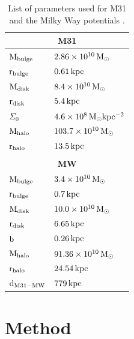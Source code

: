 \documentclass[useAMS,usenatbib]{mn2e}
\begin{document}
\begin{table}
\centering
\begin{tabular}{l l }
\multicolumn{2}{c}{\textbf{M31}}\\
\hline
\hline
$\rm{M}_{bulge}$   	& $2.86\times{10^{10}}\,\rm{M}_{\odot}$\\
$\rm{r}_{bulge}$	& $0.61\,\rm{kpc}$\\
$\rm{M}_{disk}$		&  $8.4\times{10^{10}}\,\rm{M}_{\odot}$\\
$\rm{r}_{disk}$		& $5.4\,\rm{kpc}$\\
$\Sigma_{0}$		& $4.6\times10^{8}\,\rm{M}_{\odot}\rm{kpc^{-2}}$\\
$\rm{M}_{halo}$		&  $103.7\times{10^{10}}\,\rm{M}_{\odot}$\\
$\rm{r}_{halo}$		& $13.5\,\rm{kpc}$\\
&\\
\multicolumn{2}{c}{\textbf{MW}}\\
\hline
\hline
$\rm{M}_{bulge}$       & $ 3.4\times{10^{10}}\,\rm{M}_{\odot}$   \\
$\rm{r}_{bulge}$       & $ 0.7\,\rm{kpc}$                        \\
$\rm{M}_{disk}$        & $ 10.0\times{10^{10}}\,\rm{M}_{\odot}$  \\
$\rm{r}_{disk}$        & $ 6.65\,\rm{kpc}$                       \\
$\rm{b} $              & $ 0.26\,\rm{kpc}$                       \\
$\rm{M}_{halo}$        & $ 91.36\times{10^{10}}\,\rm{M}_{\odot}$   \\
$\rm{r}_{halo}$        & $ 24.54\,\rm{kpc}$                        \\
$\rm{d}_{\rm{M31-MW}}$ & $ 779\,\rm{kpc}$                        \\   
\hline
\hline
\end{tabular}
\caption{List of parameters used for M31 \protect\cite{2006MNRAS.366..996G} and the Milky Way potentials \protect\cite{2005ApJ...635..931B}.}
\label{tabPot}
\end{table}

\section{Method}
\label{Method}
\end{document}
